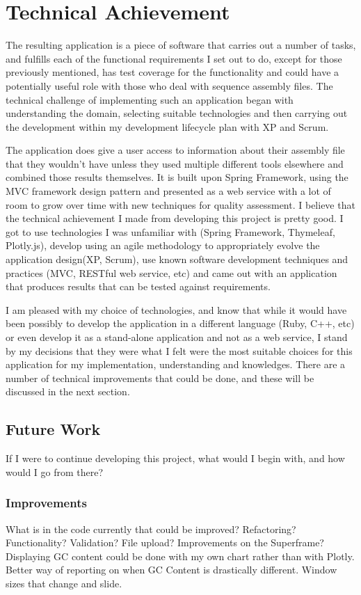 \section{Technical Achievement}
The resulting application is a piece of software that carries out a number of tasks, and fulfills each of the functional requirements I set out to do, except for those previously mentioned, has test coverage for the functionality and could have a potentially useful role with those who deal with sequence assembly files. The technical challenge of implementing such an application began with understanding the domain, selecting suitable technologies and then carrying out the development within my development lifecycle plan with XP and Scrum.

The application does give a user access to information about their assembly file that they wouldn't have unless they used multiple different tools elsewhere and combined those results themselves. It is built upon Spring Framework, using the MVC framework design pattern and presented as a web service with a lot of room to grow over time with new techniques for quality assessment. I believe that the technical achievement I made from developing this project is pretty good. I got to use technologies I was unfamiliar with (Spring Framework, Thymeleaf, Plotly.js), develop using an agile methodology to appropriately evolve the application design(XP, Scrum), use known software development techniques and practices (MVC, RESTful web service, etc) and came out with an application that produces results that can be tested against requirements.

I am pleased with my choice of technologies, and know that while it would have been possibly to develop the application in a different language (Ruby, C++, etc) or even develop it as a stand-alone application and not as a web service, I stand by my decisions that they were what I felt were the most suitable choices for this application for my implementation, understanding and knowledges. There are a number of technical improvements that could be done, and these will be discussed in the next section.

\subsection{Future Work}
If I were to continue developing this project, what would I begin with, and how would I go from there? 
\subsubsection{Improvements}
What is in the code currently that could be improved? Refactoring? Functionality? Validation? File upload?
Improvements on the Superframe? Displaying GC content could be done with my own chart rather than with Plotly. Better way of reporting on when GC Content is drastically different. Window sizes that change and slide.

